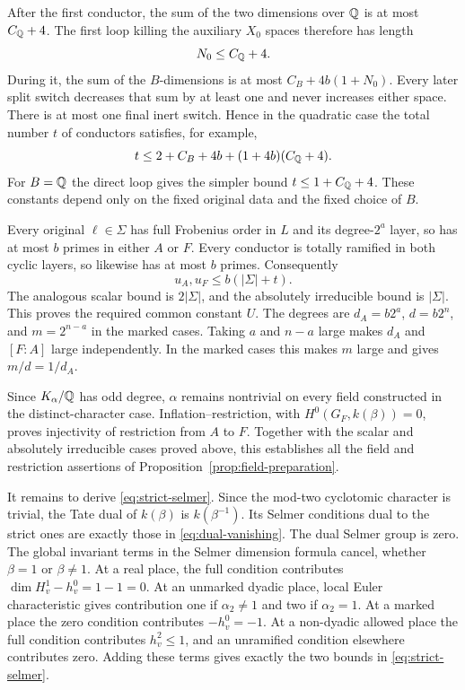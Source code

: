 After the first conductor, the sum of the two dimensions over $\mathbb Q$
is at most $C_{\mathbb Q}+4$.  The first loop killing the auxiliary $X_0$
spaces therefore has length
\[
                         N_0\le C_{\mathbb Q}+4.
\]
During it, the sum of the $B$-dimensions is at most
$C_B+4b(1+N_0)$.  Every later split switch decreases that sum by
at least one and never increases either space.  There is at most
one final inert switch.  Hence in the quadratic case the total
number $t$ of conductors satisfies, for example,
\begin{equation}\label{eq:uniform-conductor-count}
 t\le 2+C_B+4b+(1+4b)(C_{\mathbb Q}+4).
\end{equation}
For $B=\mathbb Q$ the direct loop gives the simpler bound
$t\le1+C_{\mathbb Q}+4$.  These constants depend only on the fixed
original data and the fixed choice of $B$.

Every original $\ell\in\Sigma$ has full Frobenius order in $L$ and
its degree-$2^a$ layer, so has at most $b$ primes in either $A$ or
$F$.  Every conductor is totally ramified in both cyclic layers,
so likewise has at most $b$ primes.  Consequently
\[
                         u_A,u_F\le b(|\Sigma|+t).
\]
The analogous scalar bound is $2|\Sigma|$, and the absolutely
irreducible bound is $|\Sigma|$.  This proves the required common
constant $U$.  The degrees are $d_A=b2^a$, $d=b2^n$, and
$m=2^{n-a}$ in the marked cases.  Taking $a$ and $n-a$ large makes
$d_A$ and $[F:A]$ large independently.  In the marked cases this
makes $m$ large and gives $m/d=1/d_A$.

Since $K_\alpha/\mathbb Q$ has odd degree, $\alpha$ remains nontrivial
on every field constructed in the distinct-character case.
Inflation--restriction, with
$H^0(G_F,k(\beta))=0$, proves injectivity of restriction from $A$
to $F$.  Together with the scalar and absolutely irreducible cases
proved above, this establishes all the field and restriction
assertions of Proposition~\ref{prop:field-preparation}.

It remains to derive \eqref{eq:strict-selmer}.  Since the mod-two
cyclotomic character is trivial, the Tate dual of $k(\beta)$ is
$k(\beta^{-1})$.  Its Selmer conditions dual to the strict ones
are exactly those in \eqref{eq:dual-vanishing}.  The dual Selmer
group is zero.  The global invariant terms in the Selmer dimension
formula cancel, whether $\beta=1$ or $\beta\ne1$.  At a real place,
the full condition contributes
$\dim H^1_v-h^0_v=1-1=0$.  At an unmarked dyadic place, local
Euler characteristic gives contribution one if $\alpha_2\ne1$
and two if $\alpha_2=1$.  At a marked place the zero condition
contributes $-h^0_v=-1$.  At a non-dyadic allowed place the full
condition contributes $h^2_v\le1$, and an unramified condition
elsewhere contributes zero.  Adding these terms gives exactly the
two bounds in \eqref{eq:strict-selmer}.

